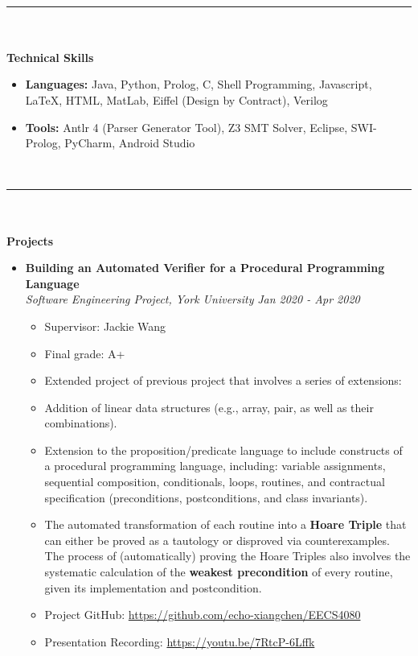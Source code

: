 \documentclass[a4paper,10pt,titlepage]{article}
\begin{document}
~\\
\rule{\linewidth}{0.1mm}
~\\
\\
\textbf {\Large Technical Skills} 
\begin{itemize}%
	\item {\bf Languages:} Java, Python, Prolog, C, Shell Programming, Javascript, \LaTeX, HTML, MatLab, Eiffel (Design by Contract),  Verilog
	\item {\bf Tools:} Antlr 4 (Parser Generator Tool), Z3 SMT Solver, Eclipse, SWI-Prolog, PyCharm, Android Studio
\end{itemize}
~\\
\rule{\linewidth}{0.1mm}
~\\
\\
\textbf {\Large Projects}
\begin{itemize}%
	\item {\bf Building an Automated Verifier for a Procedural Programming Language}
	\\\emph {Software Engineering Project, York University} {\hfill \emph{Jan 2020 - Apr 2020}}
	\begin{itemize}%
		\item Supervisor: Jackie Wang
		\item Final grade: A+
		\item Extended project of previous project that involves a series of extensions:
		\item Addition of linear data structures (e.g., array, pair, as well as their combinations).
		\item Extension to the proposition/predicate language to include constructs of a procedural programming language, including: variable assignments, sequential composition, conditionals, loops, routines, and contractual specification (preconditions, postconditions, and class invariants).
		\item The automated transformation of each routine into a {\bf Hoare Triple} that can either be proved as a tautology or disproved via counterexamples. The process of (automatically) proving the Hoare Triples also involves the systematic calculation of the {\bf weakest precondition} of every routine, given its implementation and postcondition.
		\item Project GitHub: \url{https://github.com/echo-xiangchen/EECS4080}
		\item Presentation Recording: \url{https://youtu.be/7RtcP-6Lffk}
	\end{itemize}
\end{itemize}
\end{document}
